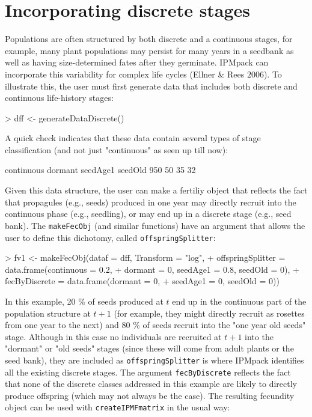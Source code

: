 \documentclass{article}
\begin{document}
\section{Incorporating discrete stages}
Populations are often structured by both discrete and a continuous stages, for example, many plant populations may persist for many years in a seedbank as well as having size-determined fates after they germinate. IPMpack can incorporate this variability for complex life cycles (Ellner \& Rees $2006$). To illustrate this, the user must first generate data that includes both discrete and continuous life-history stages:
\begin{Schunk}
\begin{Sinput}
> dff <- generateDataDiscrete()
\end{Sinput}
\end{Schunk}
A quick check indicates that these data contain several types of stage classification (and not just "continuous" as seen up till now):
\begin{Schunk}
\begin{Soutput}
continuous    dormant   seedAge1    seedOld 
       950         50         35         32 
\end{Soutput}
\end{Schunk}
Given this data structure, the user can make a fertiliy object that reflects the fact that propagules (e.g., seeds) produced in one year may directly recruit into the continuous phase (e.g., seedling), or may end up in a discrete stage (e.g., seed bank). The {\tt makeFecObj} (and similar functions) have an argument that allows the user to define this dichotomy, called {\tt offspringSplitter}:
\begin{Schunk}
\begin{Sinput}
> fv1 <- makeFecObj(dataf = dff, Transform = "log", 
+                   offspringSplitter = data.frame(continuous = 0.2, 
+                   dormant = 0, seedAge1 = 0.8, seedOld = 0), 
+                   fecByDiscrete = data.frame(dormant = 0, 
+                   seedAge1 = 0, seedOld = 0))
\end{Sinput}
\end{Schunk}
In this example, 20 \% of seeds produced at $t$ end up in the continuous part of the population structure at $t+1$ (for example, they might directly recruit as rosettes from one year to the next) and 80 \% of seeds recruit into the "one year old seeds" stage. Although in this case no individuals are recruited at $t+1$ into the "dormant" or "old seeds" stages (since these will come from adult plants or the seed bank), they are included as {\tt offspringSplitter} is where IPMpack identifies all the existing discrete stages. The argument {\tt fecByDiscrete} reflects the fact that none of the discrete classes addressed in this example are likely to directly produce offspring (which may not always be the case). The resulting fecundity object can be used with {\tt createIPMFmatrix} in the usual way:
\end{document}
